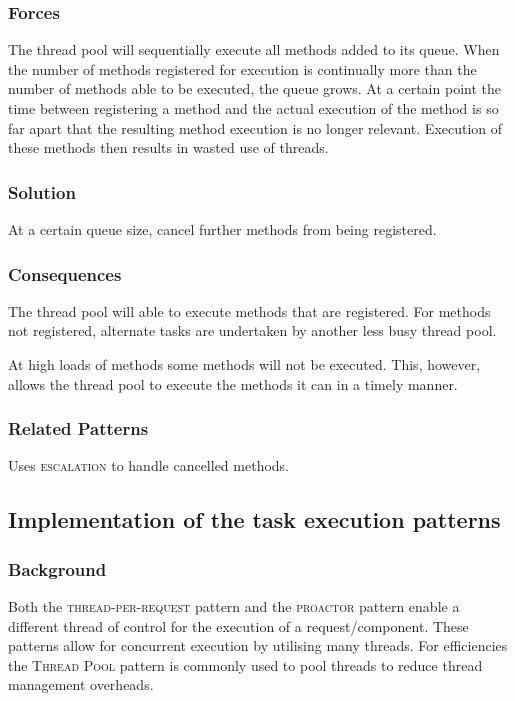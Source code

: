\documentclass[prodmode]{style/acmlarge}
\begin{document}
\subsubsection*{Forces} The thread pool will sequentially execute all methods
added to its queue.  When the number of methods registered for execution is
continually more than the number of methods able to be executed, the queue
grows.  At a certain point the time between registering a method and the actual
execution of the method is so far apart that the resulting method execution is
no longer relevant.  Execution of these methods then results in wasted use of
threads.

\subsubsection*{Solution} At a certain queue size, cancel further methods from
being registered.

\subsubsection*{Consequences} The thread pool will able to execute methods that
are registered. For methods not registered, alternate tasks are undertaken by
another less busy thread pool.

At high loads of methods some methods will not be executed.  This, however,
allows the thread pool to execute the methods it can in a timely manner.

\subsubsection*{Related Patterns} Uses \textsc{escalation} to handle cancelled
methods.



\subsection{Implementation of the task execution patterns}

\subsubsection*{Background}

Both the \textsc{thread-per-request} pattern \cite{thread-per-request} and the
\textsc{proactor} pattern \cite{proactor} enable a different thread of control
for the execution of a request/component.  These patterns allow for concurrent
execution by utilising many threads.  For efficiencies the \textsc{Thread Pool}
pattern \cite{thread-per-request} is commonly used to pool threads to reduce
thread management overheads.
\end{document}
